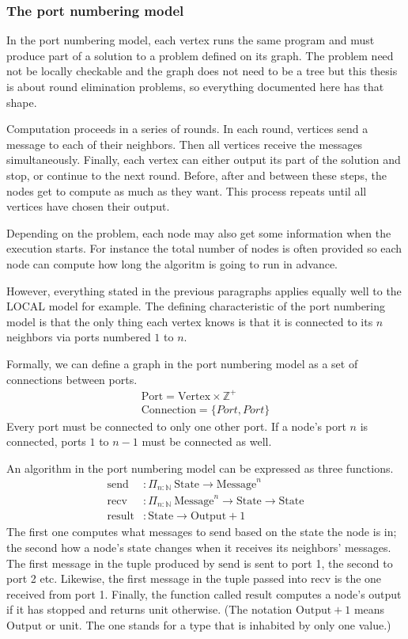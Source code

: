 \documentclass[english, 12pt, a4paper, sci, a-1b, online]{aaltothesis}
\begin{document}
\subsubsection{The port numbering model}

In the port numbering model, each vertex runs the same program and must produce part of a solution to a problem defined on its graph. The problem need not be locally checkable and the graph does not need to be a tree but this thesis is about round elimination problems, so everything documented here has that shape.

Computation proceeds in a series of rounds. In each round, vertices send a message to each of their neighbors. Then all vertices receive the messages simultaneously. Finally, each vertex can either output its part of the solution and stop, or continue to the next round. Before, after and between these steps, the nodes get to compute as much as they want. This process repeats until all vertices have chosen their output.

Depending on the problem, each node may also get some information when the execution starts. For instance the total number of nodes is often provided so each node can compute how long the algoritm is going to run in advance.

However, everything stated in the previous paragraphs applies equally well to the LOCAL model for example. The defining characteristic of the port numbering model is that the only thing each vertex knows is that it is connected to its $n$ neighbors via ports numbered $1$ to $n$.

Formally, we can define a graph in the port numbering model as a set of connections between ports.
\begin{align*}
  \text{Port} = \text{Vertex} \times \mathbb{Z^+} \\
  \text{Connection} = \{Port, Port\}
\end{align*}
Every port must be connected to only one other port. If a node's port $n$ is connected, ports $1$ to $n-1$ must be connected as well.

An algorithm in the port numbering model can be expressed as three functions.
\begin{align*}
  \text{send} &: \Pi_{n : \mathbb{N}}~\text{State} \to \text{Message}^n \\
  \text{recv} &: \Pi_{n : \mathbb{N}}~\text{Message}^n \to \text{State} \to \text{State} \\
  \text{result} &: \text{State} \to \text{Output} + 1
\end{align*}
The first one computes what messages to send based on the state the node is in; the second how a node's state changes when it receives its neighbors' messages. The first message in the tuple produced by $\text{send}$ is sent to port 1, the second to port 2 etc. Likewise, the first message in the tuple passed into $\text{recv}$ is the one received from port 1. Finally, the function called $\text{result}$ computes a node's output if it has stopped and returns unit otherwise. (The notation $\text{Output} + 1$ means $\text{Output}$ or unit. The one stands for a type that is inhabited by only one value.)
\end{document}
